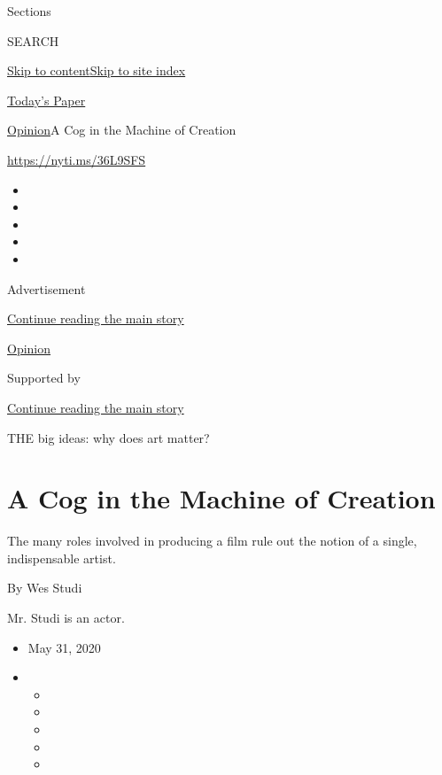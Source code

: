 Sections

SEARCH

\protect\hyperlink{site-content}{Skip to
content}\protect\hyperlink{site-index}{Skip to site index}

\href{https://myaccount.nytimes3xbfgragh.onion/auth/login?response_type=cookie\&client_id=vi}{}

\href{https://www.nytimes3xbfgragh.onion/section/todayspaper}{Today's
Paper}

\href{/section/opinion}{Opinion}\textbar{}A Cog in the Machine of
Creation

\url{https://nyti.ms/36L9SFS}

\begin{itemize}
\item
\item
\item
\item
\item
\end{itemize}

Advertisement

\protect\hyperlink{after-top}{Continue reading the main story}

\href{/section/opinion}{Opinion}

Supported by

\protect\hyperlink{after-sponsor}{Continue reading the main story}

THE big ideas: why does art matter?

\hypertarget{a-cog-in-the-machine-of-creation}{%
\section{A Cog in the Machine of
Creation}\label{a-cog-in-the-machine-of-creation}}

The many roles involved in producing a film rule out the notion of a
single, indispensable artist.

By Wes Studi

Mr. Studi is an actor.

\begin{itemize}
\item
  May 31, 2020
\item
  \begin{itemize}
  \item
  \item
  \item
  \item
  \item
  \end{itemize}
\end{itemize}

